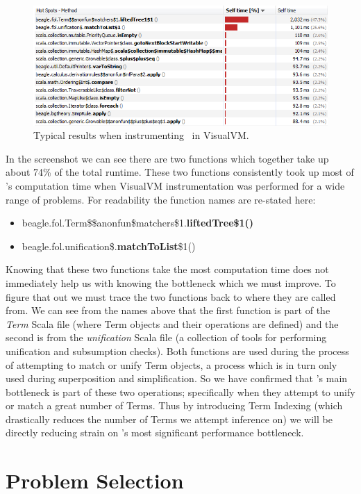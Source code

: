 \begin{figure}[H]
  \includegraphics[width=\textwidth]{resources/visualvm}
  \caption{Typical results when instrumenting \beagle\  in VisualVM.}
  \label{fig:visvm}
\end{figure}

In the screenshot we can see there are two functions which together take up about
74\% of the total runtime. These two functions consistently took up most of \beagle's
computation time when VisualVM instrumentation was performed for a wide range of problems.
For readability the function names are re-stated here:
\begin{itemize}
\item[]beagle.fol.Term\$\$anonfun\$matchers\$1.\textbf{liftedTree\$1()}
\item[]beagle.fol.unification\$.\textbf{matchToList}\$1()
\end{itemize}
Knowing that these two functions take the most computation time does not immediately
help us with knowing the bottleneck which we must improve. To figure that out we must
trace the two functions back to where they are called from. We can see from the
names above that the first function is part of the \emph{Term} Scala file (where Term objects and their
operations are defined) and the second is from the \emph{unification} Scala file (a collection
of tools for performing unification and subsumption checks). Both functions are
used during the process of attempting to match or unify Term objects, a process
which is in turn only used during superposition and simplification. So we have confirmed
that \beagle's main bottleneck is part of these two operations; specifically when they attempt
to unify or match a great number of Terms. Thus by introducing Term Indexing
(which drastically reduces the number of Terms we attempt inference on) we will
be directly reducing strain on \beagle's most significant performance bottleneck.

\section{Problem Selection}
\label{sec:problems}

